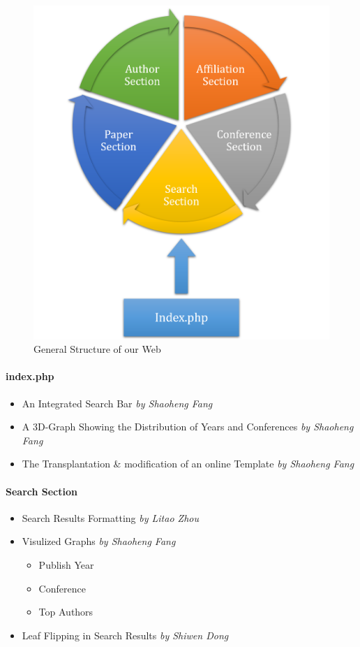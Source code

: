 \documentclass{book}
\begin{document}
\begin{figure}[H]
\centering
\includegraphics[scale=0.5]{img/zlt_pre_1.png}
\caption{General Structure of our Web}
\end{figure}

\paragraph{index.php}

\begin{itemize}
\item An Integrated Search Bar \textit{by Shaoheng Fang}
\item A 3D-Graph Showing the Distribution of Years and Conferences \textit{by Shaoheng Fang}
\item The Transplantation \& modification of an online Template  \textit{by Shaoheng Fang}
\end{itemize}

\paragraph{Search Section}
\begin{itemize}
\item Search Results Formatting \textit{by Litao Zhou}
\item Visulized Graphs \textit{by Shaoheng Fang}
\begin{itemize}
	\item Publish Year
	\item Conference
	\item Top Authors
\end{itemize}
\item Leaf Flipping in Search Results \textit{by Shiwen Dong}
\end{itemize}
\end{document}

